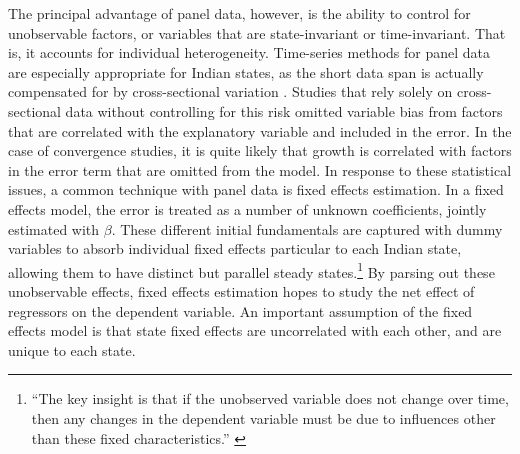 \documentclass[a4paper, 11pt]{article}
\begin{document}
The principal advantage of panel data, however, is the ability to control for unobservable factors, or variables that are state-invariant or time-invariant.  That is, it accounts for individual heterogeneity.  Time-series methods for panel data are especially appropriate for Indian states, as the short data span is actually compensated for by cross-sectional variation \citep{kalra_growth_2010}.  Studies that rely solely on cross-sectional data without controlling for this risk omitted variable bias from factors that are correlated with the explanatory variable and included in the error.  In the case of convergence studies, it is quite likely that growth is correlated with factors in the error term that are omitted from the model.  In response to these statistical issues, a common technique with panel data is fixed effects estimation.  In a fixed effects model, the error is treated as a number of unknown coefficients, jointly estimated with $\beta$.  These different initial fundamentals are captured with dummy variables to absorb individual fixed effects particular to each Indian state, allowing them to have distinct but parallel steady states.\footnote{“The key insight is that if the unobserved variable does not change over time, then any changes in the dependent variable must be due to influences other than these fixed characteristics.” \citep{stock_introduction_2003}}  By parsing out these unobservable effects, fixed effects estimation hopes to study the net effect of regressors on the dependent variable.  An important assumption of the fixed effects model is that state fixed effects are uncorrelated with each other, and are unique to each state.\par 
\end{document}
